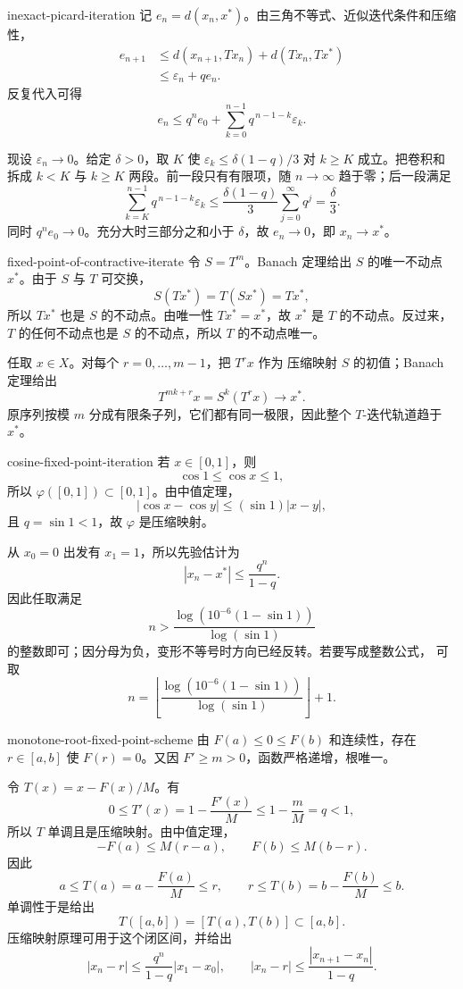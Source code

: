 \begin{solution}{inexact-picard-iteration}
记 \(e_n=d(x_n,x^\ast)\)。由三角不等式、近似迭代条件和压缩性，
\[
\begin{aligned}
 e_{n+1}
 &\le d(x_{n+1},Tx_n)+d(Tx_n,Tx^\ast)\\
 &\le\varepsilon_n+qe_n.
\end{aligned}
\]
反复代入可得
\[
 e_n\le q^ne_0+\sum_{k=0}^{n-1}q^{\,n-1-k}\varepsilon_k.
\]

现设 \(\varepsilon_n\to0\)。给定 \(\delta>0\)，取 \(K\) 使
\(\varepsilon_k\le\delta(1-q)/3\) 对 \(k\ge K\) 成立。把卷积和拆成
\(k<K\) 与 \(k\ge K\) 两段。前一段只有有限项，随 \(n\to\infty\)
趋于零；后一段满足
\[
 \sum_{k=K}^{n-1}q^{\,n-1-k}\varepsilon_k
 \le\frac{\delta(1-q)}{3}\sum_{j=0}^{\infty}q^j
 =\frac{\delta}{3}.
\]
同时 \(q^ne_0\to0\)。充分大时三部分之和小于 \(\delta\)，故
\(e_n\to0\)，即 \(x_n\to x^\ast\)。
\end{solution}

\begin{solution}{fixed-point-of-contractive-iterate}
令 \(S=T^m\)。Banach 定理给出 \(S\) 的唯一不动点 \(x^\ast\)。由于
\(S\) 与 \(T\) 可交换，
\[
 S(Tx^\ast)=T(Sx^\ast)=Tx^\ast,
\]
所以 \(Tx^\ast\) 也是 \(S\) 的不动点。由唯一性
\(Tx^\ast=x^\ast\)，故 \(x^\ast\) 是 \(T\) 的不动点。反过来，
\(T\) 的任何不动点也是 \(S\) 的不动点，所以 \(T\) 的不动点唯一。

任取 \(x\in X\)。对每个 \(r=0,\ldots,m-1\)，把 \(T^rx\) 作为
压缩映射 \(S\) 的初值；Banach 定理给出
\[
 T^{mk+r}x=S^k(T^rx)\longrightarrow x^\ast.
\]
原序列按模 \(m\) 分成有限条子列，它们都有同一极限，因此整个
\(T\)-迭代轨道趋于 \(x^\ast\)。
\end{solution}

\begin{solution}{cosine-fixed-point-iteration}
若 \(x\in[0,1]\)，则
\[
 \cos1\le\cos x\le1,
\]
所以 \(\varphi([0,1])\subset[0,1]\)。由中值定理，
\[
 |\cos x-\cos y|\le(\sin1)|x-y|,
\]
且 \(q=\sin1<1\)，故 \(\varphi\) 是压缩映射。

从 \(x_0=0\) 出发有 \(x_1=1\)，所以先验估计为
\[
 |x_n-x^\ast|\le\frac{q^n}{1-q}.
\]
因此任取满足
\[
 n>\frac{\log(10^{-6}(1-\sin1))}{\log(\sin1)}
\]
的整数即可；因分母为负，变形不等号时方向已经反转。若要写成整数公式，
可取
\[
 n=\left\lfloor
 \frac{\log(10^{-6}(1-\sin1))}{\log(\sin1)}
 \right\rfloor+1.
\]
\end{solution}

\begin{solution}{monotone-root-fixed-point-scheme}
由 \(F(a)\le0\le F(b)\) 和连续性，存在 \(r\in[a,b]\) 使
\(F(r)=0\)。又因 \(F'\ge m>0\)，函数严格递增，根唯一。

令 \(T(x)=x-F(x)/M\)。有
\[
 0\le T'(x)=1-\frac{F'(x)}M
 \le1-\frac mM=q<1,
\]
所以 \(T\) 单调且是压缩映射。由中值定理，
\[
 -F(a)\le M(r-a),\qquad F(b)\le M(b-r).
\]
因此
\[
 a\le T(a)=a-\frac{F(a)}M\le r,\qquad
 r\le T(b)=b-\frac{F(b)}M\le b.
\]
单调性于是给出
\[
 T([a,b])=[T(a),T(b)]\subset[a,b].
\]
压缩映射原理可用于这个闭区间，并给出
\[
 |x_n-r|
 \le\frac{q^n}{1-q}|x_1-x_0|,
\qquad
 |x_n-r|\le\frac{|x_{n+1}-x_n|}{1-q}.
\]
\end{solution}

